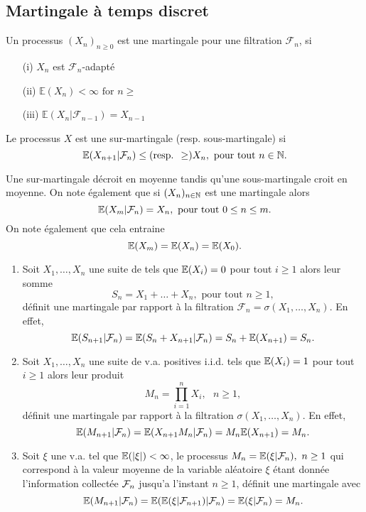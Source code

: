 \subsection{Martingale à temps discret}
\begin{definition}
Un processus $(X_n)_{n\geq0}$ est une martingale pour une filtration $\mathcal{F}_n$, si
\begin{itemize}
  \item[(i)] $X_n$ est $\mathcal{F}_n$-adapté
  \item[(ii)] $\mathbb{E}(X_n)<\infty\text{ for }n\geq$ 
  \item[(iii)] $\mathbb{E}(X_n|\mathcal{F}_{n-1}) = X_{n-1}$
\end{itemize} 
\end{definition}
\begin{definition}
Le processus $X$ est une sur-martingale (resp. sous-martingale) si
    $$
    \mathbb{E}(X_{n+1}|\mathcal{F}_n) \leq (\text{resp. } \geq ) X_n,\text{ pour tout } n\in \mathbb{N}.
    $$
\end{definition}
\begin{remark}    
Une sur-martingale décroit en moyenne tandis qu'une sous-martingale croit en moyenne. On note également que si $(X_n)_{n\in \mathbb{N}}$ est une martingale alors
$$
\mathbb{E}(X_m|\mathcal{F}_n) = X_n,\text{ pour tout }0\leq n\leq m.
$$
On note également que cela entraine
$$
\mathbb{E}(X_m)=\mathbb{E}(X_n)=\mathbb{E}(X_0).
$$
\end{remark}
\begin{ex}
\begin{enumerate}
    \item Soit $X_1,\ldots, X_n$ une suite de \va \iid tels que $\mathbb{E}(X_i) = 0$ pour tout $i\geq 1$ alors leur somme
    $$
    S_n = X_1+\ldots+X_n,\text{ pour tout }n\geq1,
    $$
    définit une martingale par rapport à la filtration $\mathcal{F}_n = \sigma(X_1,\ldots, X_n)$. En effet,
    $$
    \mathbb{E}(S_{n+1}|\mathcal{F}_n) =\mathbb{E}(S_{n}+X_{n+1}|\mathcal{F}_n) = S_n + \mathbb{E}(X_{n+1}) = S_n.
    $$
    \item Soit $X_1,\ldots, X_n$ une suite de v.a. positives i.i.d. tels que $\mathbb{E}(X_i) = 1$ pour tout $i\geq 1$ alors leur produit
    $$
    M_n = \prod_{i=1}^n X_i,\text{ }n\geq1,
    $$
    définit une martingale par rapport à la filtration $\sigma(X_1,\ldots, X_n)$. En effet,
    $$
    \mathbb{E}(M_{n+1}|\mathcal{F}_n) =\mathbb{E}(X_{n+1}M_n|\mathcal{F}_n) = M_n\mathbb{E}(X_{n+1}) = M_n.
    $$
    \item Soit $\xi$ une v.a. tel que $\mathbb{E}(|\xi|)<\infty$, le processus $M_n = \mathbb{E}(\xi|\mathcal{F}_n),\text{ }n\geq1$ qui correspond à la valeur moyenne de la variable aléatoire $\xi$ étant donnée l'information collectée $\mathcal{F}_n$ jusqu'a l'instant $n\geq1$, définit une martingale avec
    $$
    \mathbb{E}(M_{n+1}|\mathcal{F}_n) = \mathbb{E}(\mathbb{E}(\xi|\mathcal{F}_{n+1})|\mathcal{F}_n) =\mathbb{E}(\xi|\mathcal{F}_n) = M_n.
    $$
\end{enumerate}
\end{ex}
